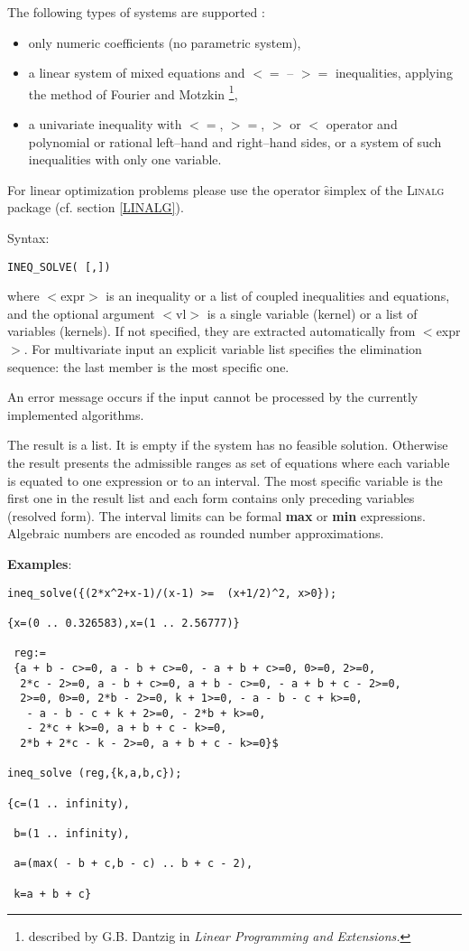 
The following types of systems are supported :
\begin{itemize}
\item only numeric coefficients (no parametric system),
\item a linear system of mixed equations and $<=$ -- $>=$ 
     inequalities, applying the method of Fourier and Motzkin
     \footnote{described by G.B. Dantzig in {\em Linear Programming 
      and Extensions.}},
\item a univariate inequality with $<=$, $>=$, $>$ or $<$ operator
     and polynomial or rational left--hand and right--hand sides,
     or a system of such inequalities with only one variable.
\end{itemize}
For linear optimization problems please use the operator
\f{simplex} of the \textsc{Linalg} package (cf. section \ref{LINALG}).

Syntax:
\begin{syntax}
\texttt{INEQ\_SOLVE( [,])}
\end{syntax}
where $<$expr$>$ is an inequality or a list of coupled inequalities
and equations, and the optional argument $<$vl$>$ is a single
variable (kernel) or a list of variables (kernels). If not
specified, they are extracted automatically from $<$expr$>$.
For multivariate input an explicit variable list specifies the
elimination sequence: the last member is the most specific one.

An error message occurs if the input cannot be processed by the
currently implemented algorithms.

The result is a list. It is empty if the system has no feasible solution.
Otherwise the result presents the admissible ranges as set
of equations where each variable is equated to 
one expression or to an interval. 
The most specific variable is the first one in the result list and
each form contains only preceding variables (resolved form).
The interval limits can be formal \textbf{max} or \textbf{min} expressions.
Algebraic numbers are encoded as rounded number approximations.

\noindent
\textbf{Examples}:
\begin{verbatim}
ineq_solve({(2*x^2+x-1)/(x-1) >=  (x+1/2)^2, x>0});

{x=(0 .. 0.326583),x=(1 .. 2.56777)}

 reg:=
 {a + b - c>=0, a - b + c>=0, - a + b + c>=0, 0>=0, 2>=0,
  2*c - 2>=0, a - b + c>=0, a + b - c>=0, - a + b + c - 2>=0,
  2>=0, 0>=0, 2*b - 2>=0, k + 1>=0, - a - b - c + k>=0,
   - a - b - c + k + 2>=0, - 2*b + k>=0,
   - 2*c + k>=0, a + b + c - k>=0,
  2*b + 2*c - k - 2>=0, a + b + c - k>=0}$

ineq_solve (reg,{k,a,b,c});

{c=(1 .. infinity),

 b=(1 .. infinity),

 a=(max( - b + c,b - c) .. b + c - 2),

 k=a + b + c}
\end{verbatim}


